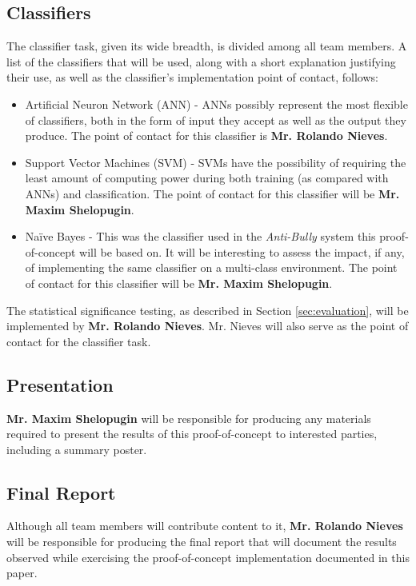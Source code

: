 \documentclass[conference]{sig-alternate-05-2015}
\begin{document}
\subsection{Classifiers}\label{sec:classifier_task}
The classifier task, given its wide breadth, is divided among all team
members. A list of the classifiers that will be used, along with a short
explanation justifying their use, as well as the classifier's implementation
point of contact, follows:
\begin{itemize}
  \item Artificial Neuron Network (ANN) - ANNs possibly represent
  the most flexible of classifiers, both in the form of input they accept as
  well as the output they produce. The point of contact for this classifier is
  \textbf{Mr. Rolando Nieves}.
  \item Support Vector Machines (SVM) - SVMs have the possibility of requiring
  the least amount of computing power during both training (as compared with
  ANNs) and classification. The point of contact for this classifier will be
  \textbf{Mr. Maxim Shelopugin}.
  \item Na\"{i}ve Bayes - This was the classifier used in the \textit{Anti-Bully}
  system this proof-of-concept will be based on. It will be interesting to
  assess the impact, if any, of implementing the same classifier on a
  multi-class environment. The point of contact for this classifier will be
  \textbf{Mr. Maxim Shelopugin}.
\end{itemize}

The statistical significance testing, as described in Section
\ref{sec:evaluation}, will be implemented by \textbf{Mr. Rolando Nieves}. Mr.
Nieves will also serve as the point of contact for the classifier task.

\subsection{Presentation}\label{sec:presentation_task}
\textbf{Mr. Maxim Shelopugin} will be responsible for producing any materials
required to present the results of this proof-of-concept to interested parties,
including a summary poster.

\subsection{Final Report}\label{sec:report_task}
Although all team members will contribute content to it,
\textbf{Mr. Rolando Nieves} will be responsible for producing the final report
that will document the results observed while exercising the proof-of-concept
implementation documented in this paper.



\end{document}
